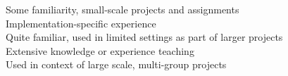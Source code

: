 \documentclass[a4paper,10pt]{article}
\begin{document}
\vspace{1em}

\begin{center}
\parbox{12cm}{
\onenote Some familiarity, small-scale projects and assignments \\
\twonotes Implementation-specific experience \\
\threenotes Quite familiar, used in limited settings as part of larger projects \\
\fournotes Extensive knowledge or experience teaching \\
\fivenotes Used in context of large scale, multi-group projects}
\end{center}

% 

\end{document}
